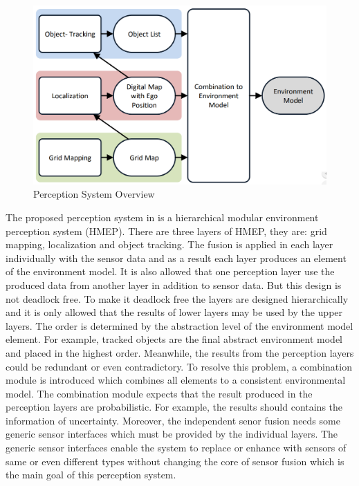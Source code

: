 \begin{figure}
  \centering
  \includegraphics[width=.6\textwidth]{src/pic/kunz_PS.png}
  \caption{Perception System Overview \cite{Kunz_2015}}
  \label{fig:kunz_PS}
\end{figure}
The proposed perception system in \cite{Kunz_2015} is a hierarchical modular environment perception system (HMEP). There are three layers of HMEP, they are: grid mapping, localization and object tracking. The fusion is applied in each layer individually with the sensor data and as a result each layer produces an element of the environment model. It is also allowed that one perception layer use the produced data from another layer in addition to sensor data. But this design is not deadlock free. To make it deadlock free the layers are designed hierarchically and it is only allowed that the results of lower layers may be used by the upper layers. The order is determined by the abstraction level of the environment model element. For example, tracked objects are the final abstract environment model and placed in the highest order. Meanwhile, the results from the perception layers could be redundant or even contradictory\cite{Kunz_2015}. To resolve this problem, a combination module is introduced which combines all elements to a consistent environmental model\cite{Kunz_2015}. The combination module expects that the result produced in the perception layers are probabilistic. For example, the results should contains the information of uncertainty\cite{Kunz_2015}. Moreover, the independent senor fusion needs some generic sensor interfaces which must be provided by the individual layers. The generic sensor interfaces enable the system to replace or enhance with sensors of same or even different types without changing the core of sensor fusion which is the main goal of this perception system.

